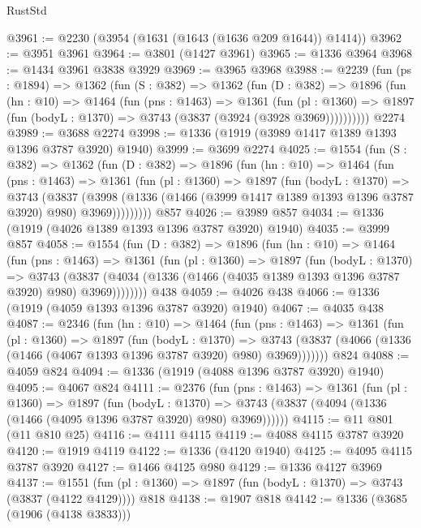 \begin{lexlean}{RustStd}
\begin{coremodule}
@3961 := @2230 (@3954 (@1631 (@1643 (@1636 @209 @1644)) @1414))
@3962 := @3951 @3961
@3964 := @3801 (@1427 @3961)
@3965 := @1336 @3964
@3968 := @1434 @3961 @3838 @3929
@3969 := @3965 @3968
@3988 := @2239
    (fun (ps : @1894) =>
    @1362
      (fun (S : @382) =>
      @1362
        (fun (D : @382) =>
        @1896
          (fun (hn : @10) =>
          @1464
            (fun (pns : @1463) =>
            @1361
              (fun (pl : @1360) =>
              @1897 (fun (bodyL : @1370) => @3743 (@3837 (@3924 (@3928 @3969))))))))))
    @2274
@3989 := @3688 @2274
@3998 := @1336 (@1919 (@3989 @1417 @1389 @1393 @1396 @3787 @3920) @1940)
@3999 := @3699 @2274
@4025 := @1554
    (fun (S : @382) =>
    @1362
      (fun (D : @382) =>
      @1896
        (fun (hn : @10) =>
        @1464
          (fun (pns : @1463) =>
          @1361
            (fun (pl : @1360) =>
            @1897
              (fun (bodyL : @1370) =>
              @3743
                (@3837
                  (@3998
                    (@1336 (@1466 (@3999 @1417 @1389 @1393 @1396 @3787 @3920) @980) @3969)))))))))
    @857
@4026 := @3989 @857
@4034 := @1336 (@1919 (@4026 @1389 @1393 @1396 @3787 @3920) @1940)
@4035 := @3999 @857
@4058 := @1554
    (fun (D : @382) =>
    @1896
      (fun (hn : @10) =>
      @1464
        (fun (pns : @1463) =>
        @1361
          (fun (pl : @1360) =>
          @1897
            (fun (bodyL : @1370) =>
            @3743
              (@3837 (@4034 (@1336 (@1466 (@4035 @1389 @1393 @1396 @3787 @3920) @980) @3969))))))))
    @438
@4059 := @4026 @438
@4066 := @1336 (@1919 (@4059 @1393 @1396 @3787 @3920) @1940)
@4067 := @4035 @438
@4087 := @2346
    (fun (hn : @10) =>
    @1464
      (fun (pns : @1463) =>
      @1361
        (fun (pl : @1360) =>
        @1897
          (fun (bodyL : @1370) =>
          @3743 (@3837 (@4066 (@1336 (@1466 (@4067 @1393 @1396 @3787 @3920) @980) @3969)))))))
    @824
@4088 := @4059 @824
@4094 := @1336 (@1919 (@4088 @1396 @3787 @3920) @1940)
@4095 := @4067 @824
@4111 := @2376
    (fun (pns : @1463) =>
    @1361
      (fun (pl : @1360) =>
      @1897
        (fun (bodyL : @1370) =>
        @3743 (@3837 (@4094 (@1336 (@1466 (@4095 @1396 @3787 @3920) @980) @3969))))))
@4115 := @11 @801 (@11 @810 @25)
@4116 := @4111 @4115
@4119 := @4088 @4115 @3787 @3920
@4120 := @1919 @4119
@4122 := @1336 (@4120 @1940)
@4125 := @4095 @4115 @3787 @3920
@4127 := @1466 @4125 @980
@4129 := @1336 @4127 @3969
@4137 := @1551 (fun (pl : @1360) => @1897 (fun (bodyL : @1370) => @3743 (@3837 (@4122 @4129)))) @818
@4138 := @1907 @818
@4142 := @1336 (@3685 (@1906 (@4138 @3833)))

\end{coremodule}
\end{lexlean}
